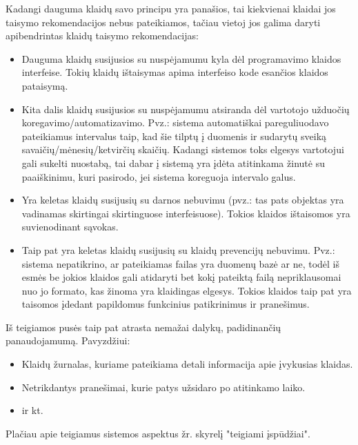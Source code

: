Kadangi dauguma klaidų savo principu yra panašios, tai kiekvienai klaidai jos taisymo
rekomendacijos nebus pateikiamos, tačiau vietoj jos galima daryti apibendrintas klaidų
taisymo rekomendacijas:
\begin{itemize}
  \item Dauguma klaidų susijusios su nuspėjamumu kyla dėl programavimo klaidos interfeise.
  Tokių klaidų ištaisymas apima interfeiso kode esančios klaidos pataisymą.
  \item Kita dalis klaidų susijusios su nuspėjamumu atsiranda dėl vartotojo užduočių
  koregavimo/automatizavimo. Pvz.: sistema automatiškai pareguliuodavo pateikiamus intervalus
  taip, kad šie tilptų į duomenis ir sudarytų sveiką savaičių/mėnesių/ketvirčių skaičių.
  Kadangi sistemos toks elgesys vartotojui gali sukelti nuostabą, tai dabar į sistemą yra
  įdėta atitinkama žinutė su paaiškinimu, kuri pasirodo, jei sistema koreguoja intervalo galus.
  \item Yra keletas klaidų susijusių su darnos nebuvimu (pvz.: tas pats objektas yra vadinamas
  skirtingai skirtinguose interfeisuose). Tokios klaidos ištaisomos yra suvienodinant sąvokas.
  \item Taip pat yra keletas klaidų susijusių su klaidų prevencijų nebuvimu. Pvz.: sistema nepatikrino, ar pateikiamas failas yra duomenų bazė ar ne, todėl iš esmės be jokios klaidos gali atidaryti bet kokį pateiktą failą nepriklausomai nuo jo formato, kas žinoma yra klaidingas elgesys. Tokios klaidos taip pat yra taisomos įdedant papildomus funkcinius patikrinimus ir pranešimus.
\end{itemize}

\vspace{1cm}
Iš teigiamos pusės taip pat atrasta nemažai dalykų, padidinančių panaudojamumą. Pavyzdžiui:
\begin{itemize}
  \item Klaidų žurnalas, kuriame pateikiama detali informacija apie įvykusias klaidas.
  \item Netrikdantys pranešimai, kurie patys užsidaro po atitinkamo laiko.
  \item ir kt.
\end{itemize}

Plačiau apie teigiamus sistemos aspektus žr. skyrelį "teigiami įspūdžiai".

